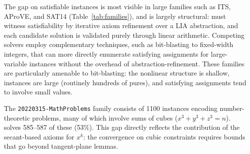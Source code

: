The gap on satisfiable instances is most visible in large families such as ITS, AProVE, and
SAT14 (Table~\ref{tab:families}), and is largely structural: \solver must witness satisfiability
by iterative axiom refinement over a LIA abstraction, and each candidate solution is validated
purely through linear arithmetic.
Competing solvers employ complementary techniques, such as bit-blasting to fixed-width
integers, that can more directly enumerate satisfying
assignments for large-variable instances without the overhead of abstraction-refinement.
These families are particularly amenable to bit-blasting: the nonlinear structure is shallow,
instances are large (routinely hundreds of pures), and satisfying assignments tend to involve
small values.

The \texttt{20220315-MathProblems} family consists of 1100 instances encoding number-theoretic
problems, many of which involve sums of cubes ($x^3 + y^3 + z^3 = n$).
\solver solves 585--587 of these (53\%). This gap directly reflects the contribution of the
secant-based axioms for $x^k$: the convergence on cubic constraints requires bounds that go
beyond tangent-plane lemmas.
